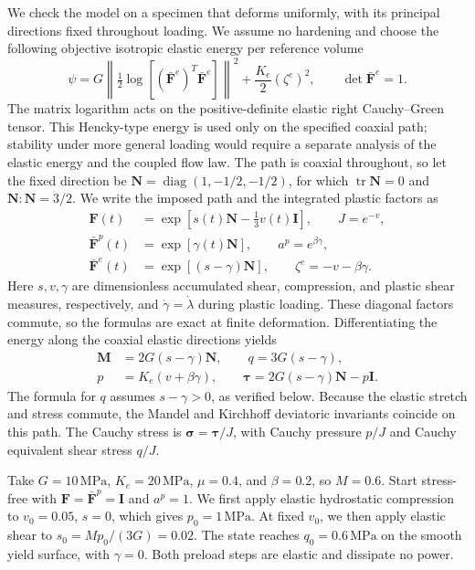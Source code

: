 \documentclass[11pt]{article}
\newcommand{\mbf}[1]{\mathbf{#1}}
\newcommand{\bs}[1]{\boldsymbol{#1}}
\newcommand{\tr}{\operatorname{tr}}
\begin{document}
We check the model on a specimen that deforms uniformly, with its principal
directions fixed throughout loading. We assume no hardening and choose the
following objective isotropic elastic energy per reference volume
\begin{equation}
 \psi=G\left\|\tfrac12\log\left[(\bar{\mbf F}^e)^T
 \bar{\mbf F}^e\right]\right\|^2+\frac{K_e}{2}(\zeta^e)^2,
 \qquad \det\bar{\mbf F}^e=1.
 \label{eq:example_energy}
\end{equation}
The matrix logarithm acts on the positive-definite elastic right
Cauchy--Green tensor. This Hencky-type energy is used only on the specified
coaxial path; stability under more general loading would require a separate
analysis of the elastic energy and the coupled flow law.
The path is coaxial throughout, so let the fixed direction be
\(\mbf N=\operatorname{diag}(1,-1/2,-1/2)\), for which
\(\tr\mbf N=0\) and \(\mbf N:\mbf N=3/2\). We write the imposed path
and the integrated plastic factors as
\begin{align*}
 \mbf F(t)&=\exp\left[s(t)\mbf N-\tfrac13v(t)\mbf I\right],
 \qquad J=e^{-v}, \\
 \bar{\mbf F}^p(t)&=\exp[\gamma(t)\mbf N],
 \qquad a^p=e^{\beta\gamma}, \\
 \bar{\mbf F}^e(t)&=\exp[(s-\gamma)\mbf N],
 \qquad \zeta^e=-v-\beta\gamma.
\end{align*}
Here \(s,v,\gamma\) are dimensionless accumulated shear, compression, and
plastic shear measures, respectively, and \(\dot\gamma=\dot\lambda\) during
plastic loading. These diagonal factors commute, so the formulas are exact at
finite deformation. Differentiating the energy along the coaxial elastic
directions yields
\begin{align}
 \mbf M&=2G(s-\gamma)\mbf N,
 \qquad q=3G(s-\gamma), \label{eq:example_shear_stress}\\
 p&=K_e(v+\beta\gamma),
 \qquad \bs\tau=2G(s-\gamma)\mbf N-p\mbf I.
 \label{eq:example_pressure}
\end{align}
The formula for \(q\) assumes \(s-\gamma>0\), as verified below.
Because the elastic stretch and stress commute, the Mandel and Kirchhoff
deviatoric invariants coincide on this path. The Cauchy stress is
\(\bs\sigma=\bs\tau/J\), with Cauchy pressure \(p/J\) and
Cauchy equivalent shear stress \(q/J\).

Take \(G=10\,\mathrm{MPa}\), \(K_e=20\,\mathrm{MPa}\),
\(\mu=0.4\), and \(\beta=0.2\), so \(M=0.6\). Start stress-free with
\(\mbf F=\bar{\mbf F}^p=\mbf I\) and \(a^p=1\). We first apply elastic
hydrostatic compression to \(v_0=0.05\), \(s=0\), which gives
\(p_0=1\,\mathrm{MPa}\). At fixed \(v_0\), we then apply elastic shear to
\(s_0=Mp_0/(3G)=0.02\). The state reaches \(q_0=0.6\,\mathrm{MPa}\)
on the smooth yield surface, with \(\gamma=0\). Both preload steps are elastic
and dissipate no power.
\end{document}
